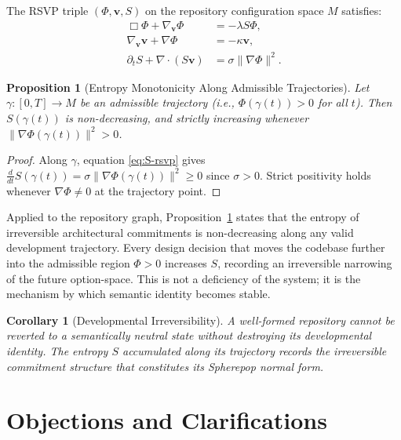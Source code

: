 \documentclass[11pt]{article}
\newtheorem{proposition}[theorem]{Proposition}
\newtheorem{corollary}[theorem]{Corollary}
\begin{document}
The RSVP triple $(\Phi, \mathbf{v}, S)$ on the repository configuration space
$M$ satisfies:
\begin{align}
\Box\Phi + \nabla_{\mathbf{v}}\Phi &= -\lambda S\Phi, \label{eq:phi-rsvp}\\
\nabla_{\mathbf{v}}\mathbf{v} + \nabla\Phi &= -\kappa\mathbf{v}, \label{eq:v-rsvp}\\
\partial_t S + \nabla\cdot(S\mathbf{v}) &= \sigma\|\nabla\Phi\|^2.
\label{eq:S-rsvp}
\end{align}

\begin{proposition}[Entropy Monotonicity Along Admissible Trajectories]
\label{prop:entropy-mono}
Let $\gamma : [0,T] \to M$ be an admissible trajectory (i.e., $\Phi(\gamma(t))
> 0$ for all $t$). Then $S(\gamma(t))$ is non-decreasing, and strictly
increasing whenever $\|\nabla\Phi(\gamma(t))\|^2 > 0$.
\end{proposition}

\begin{proof}
Along $\gamma$, equation \eqref{eq:S-rsvp} gives $\frac{d}{dt}S(\gamma(t)) =
\sigma\|\nabla\Phi(\gamma(t))\|^2 \geq 0$ since $\sigma > 0$. Strict positivity
holds whenever $\nabla\Phi \neq 0$ at the trajectory point.
\end{proof}

Applied to the repository graph, Proposition~\ref{prop:entropy-mono} states that
the entropy of irreversible architectural commitments is non-decreasing along any
valid development trajectory. Every design decision that moves the codebase
further into the admissible region $\Phi > 0$ increases $S$, recording an
irreversible narrowing of the future option-space. This is not a deficiency of
the system; it is the mechanism by which semantic identity becomes stable.

\begin{corollary}[Developmental Irreversibility]
A well-formed repository cannot be reverted to a semantically neutral state
without destroying its developmental identity. The entropy $S$ accumulated
along its trajectory records the irreversible commitment structure that
constitutes its Spherepop normal form.
\end{corollary}


\section{Objections and Clarifications}
\end{document}
